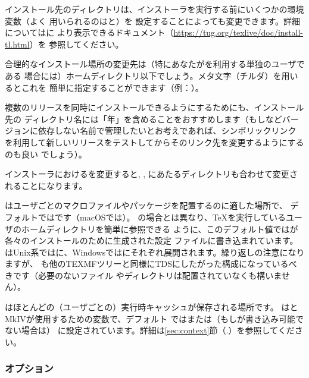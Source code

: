 \documentclass[uplatex,dvipdfmx,12pt]{jsarticle}
\begin{document}
インストール先のディレクトリは、インストーラを実行する前にいくつかの環境変数（よく
用いられるのはと）を
設定することによっても変更できます。詳細についてはに
より表示できるドキュメント（\url{https://tug.org/texlive/doc/install-tl.html}）を
参照してください。

合理的なインストール場所の変更先は（特にあなたが\TL を利用する単独のユーザである
場合には）ホームディレクトリ以下でしょう。メタ文字\dir{~}（チルダ）を用いるとこれを
簡単に指定することができます（例：）。

複数の\TL リリースを同時にインストールできるようにするためにも、インストール先の
ディレクトリ名には「年」を含めることをおすすめします（もしなどバージョンに依存しない名前で管理したいとお考えであれば、シンボリックリンク
を利用して新しいリリースをテストしてからそのリンク先を変更するようにするのも良い
でしょう）。

インストーラにおけるを変更すると, ,
にあたるディレクトリも合わせて変更されることになります。

はユーザごとのマクロファイルやパッケージを配置するのに適した場所で、
デフォルトではです（macOSでは）。%
の場合とは異なり、\TeX を実行しているユーザのホームディレクトリを簡単に参照できる
ように、このデフォルト値では\dir{~}が各々のインストールのために生成された設定
ファイルに書き込まれています。\dir{~}はUnix系ではに、Windowsではにそれぞれ展開されます。繰り返しの注意になりますが、%
も他のTEXMFツリーと同様にTDSにしたがった構成になっているべきです（必要のないファイル
やディレクトリは配置されていなくも構いません）。

はほとんどの（ユーザごとの）実行時キャッシュが保存される場所です。
は\LuaLaTeX と{\ConTeXt} MkIVが使用するための変数で、デフォルト
ではまたは（もしが書き込み可能でない場合は）
に設定されています。詳細は\ref{sec:context}節（\p.\pageref{%
sec:context}）を参照してください。

\subsubsection{オプション}
\label{sec:options}
\end{document}
